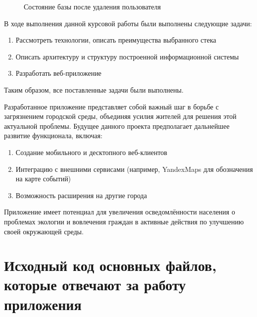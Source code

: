 \documentclass[coursework]{SCWorks}
\begin{document}
\begin{figure}[H]
	\caption{Состояние базы после удаления пользователя}
	\label{pic9}
\end{figure}

\conclusion

В ходе выполнения данной курсовой работы были выполнены следующие задачи:
\begin{enumerate}
    \item Рассмотреть технологии, описать преимущества выбранного стека
    \item Описать архитектуру и структуру построенной информационной системы
    \item Разработать веб-приложение 
\end{enumerate}

Таким образом, все поставленные задачи были выполнены.

Разработанное приложение представляет собой важный шаг в борьбе 
с загрязнением городской среды, объединяя усилия жителей для решения этой 
актуальной проблемы. Будущее данного проекта предполагает дальнейшее развитие 
функционала, включая: 

\begin{enumerate}
    \item Создание мобильного и десктопного веб-клиентов
    \item Интеграцию с внешними сервисами (например, YandexMaps для обозначения
    на карте событий)
    \item Возможность расширения на другие города 
\end{enumerate}

Приложение имеет потенциал для увеличения осведомлённости населения о 
проблемах экологии и вовлечения граждан в активные действия по улучшению 
своей окружающей среды.

\nocite{*}




\appendix

\section{Исходный код основных файлов, которые отвечают за работу приложения}
\label{appendA}
\end{document}
